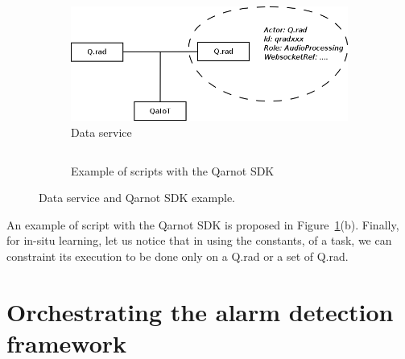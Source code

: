 \documentclass[10pt, conference, compsocconf]{IEEEtran}
\begin{document}
	\begin{figure}[ht]
          \begin{subfigure}[b]{0.4\textwidth}
            \centering
            \includegraphics[scale=0.25]{./Figures/DataService.png}
            \caption{Data service}
          \end{subfigure}
          \begin{subfigure}[b]{0.6\textwidth}
            \centering
            \inputminted[baselinestretch=1, bgcolor=LightGray, fontsize=\scriptsize]{python}{sample.py}
            \caption{Example of scripts with the Qarnot SDK}
          \end{subfigure}
          \caption{Data service and Qarnot SDK example.} 
          \label{fig:arch}
	\end{figure}

An example of script with the Qarnot SDK is proposed in Figure~\ref{fig:arch}(b). Finally, for in-situ learning, let us notice that 
in using the constants, of a task, we can constraint its execution to be done only on a Q.rad or a set of Q.rad.


\section{Orchestrating the alarm detection framework} \label{Orchestrator}
\end{document}
